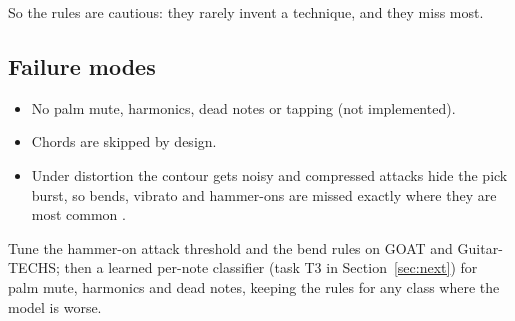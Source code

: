 So the rules are cautious: they rarely invent a technique, and they miss most.

\subsection{Failure modes}
\begin{itemize}
\item No palm mute, harmonics, dead notes or tapping (not implemented).
\item Chords are skipped by design.
\item Under distortion the contour gets noisy and compressed attacks hide the
  pick burst, so bends, vibrato and hammer-ons are missed exactly where they are
  most common \expected.
\end{itemize}

\begin{nextsteps}
Tune the hammer-on attack threshold and the bend rules on GOAT and
Guitar-TECHS; then a learned per-note classifier (task T3 in
Section~\ref{sec:next}) for palm mute, harmonics and dead notes, keeping the
rules for any class where the model is worse.
\end{nextsteps}
